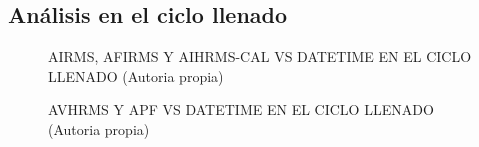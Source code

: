 \subsection{Análisis en el ciclo llenado}
\begin{figure}[H]
  \hfill
  \hfill
  \hfill
  \caption{AIRMS, AFIRMS Y AIHRMS-CAL VS DATETIME EN EL CICLO LLENADO (Autoria propia)}
  \end{figure}
\begin{figure}[H]
  \hfill
  \hfill
  \hfill
  \caption{AVHRMS Y APF VS DATETIME EN EL CICLO LLENADO (Autoria propia)}
  \end{figure}
